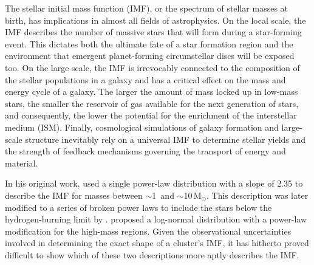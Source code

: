 \documentclass[referee]{aa}
\newcommand{\msune}{M$_\odot$}
\newcommand{\s}{$\sim$}
\begin{document}
The stellar initial mass function (IMF), or the spectrum of stellar masses at birth, has implications in almost all fields of astrophysics.
On the local scale, the IMF describes the number of massive stars that will form during a star-forming event.
This dictates both the ultimate fate of a star formation region and the environment that emergent planet-forming circumstellar discs will be exposed too.
On the large scale, the IMF is irrevocably connected to the composition of the stellar populations in a galaxy and has a critical effect on the mass and energy cycle of a galaxy.
The larger the amount of mass locked up in low-mass stars, the smaller the reservoir of gas available for the next generation of stars, and consequently, the lower the potential for the enrichment of the interstellar medium (ISM).
Finally, cosmological simulations of galaxy formation and large-scale structure inevitably rely on a universal IMF to determine stellar yields and the strength of feedback mechanisms governing the transport of energy and material.

In his original work, \citet{salpeter1955} used a single power-law distribution with a slope of 2.35 to describe the IMF for masses between \s1\ and \s10\,\msune.
This description was later modified to a series of broken power laws to include the stars below the hydrogen-burning limit by \citet{kroupa2001}\@.
\citet{chabrier2003, Chabrier2005} proposed a log-normal distribution with a power-law modification for the high-mass regions.
Given the observational uncertainties involved in determining the exact shape of a cluster's IMF, it has hitherto proved difficult to show which of these two descriptions more aptly describes the IMF\@.
\end{document}
